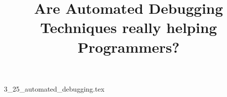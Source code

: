 \documentclass{article}      %
\title{Are Automated Debugging Techniques really helping Programmers?}  %
\begin{document}

\maketitle                   %



{3_25_automated_debugging.tex}
\printbibliography
\end{document}
